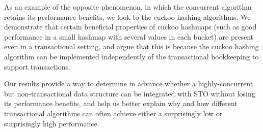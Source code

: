 As an example of the opposite phenomenon, in which the concurrent algorithm retains its performance benefits, we look to the cuckoo hashing algorithms. We demonstrate that certain beneficial properties of cuckoo hashmaps (such as good performance in a small hashmap with several values in each bucket) are present even in a transactional setting, and argue that this is because the cuckoo hashing algorithm can be implemented independently of the transactional bookkeeping to support transactions.

Our results provide a way to determine in advance whether a highly-concurrent but non-transactional data structure can be integrated with STO without losing its performance benefits, and help us better explain why and how different transactional algorithms can often achieve either a surprisingly low or surprisingly high performance.
